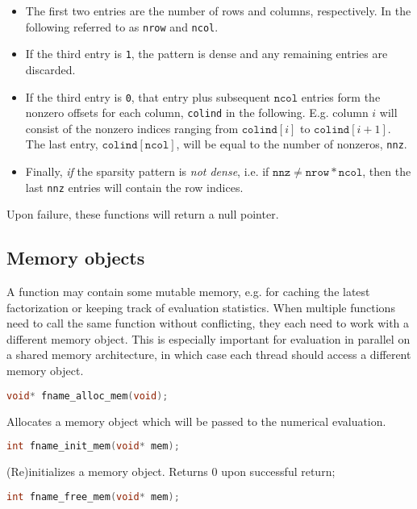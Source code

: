 \documentclass[a4paper,12pt]{book}
\begin{document}
\begin{itemize}
  \item The first two entries are the number of rows and columns, respectively.
  In the following referred to as \texttt{nrow} and \texttt{ncol}.
  \item If the third entry is \texttt{1}, the pattern is dense and any remaining entries are discarded.
  \item If the third entry is \texttt{0}, that entry plus subsequent $\texttt{ncol}$ entries form the nonzero offsets
  for each column, \texttt{colind} in the following. E.g. column $i$ will consist
  of the nonzero indices ranging from $\texttt{colind}[i]$ to $\texttt{colind}[i+1]$.
  The last entry, $\texttt{colind}[\texttt{ncol}]$, will be equal to the number
  of nonzeros, \texttt{nnz}.
  \item Finally, \emph{if} the sparsity pattern is \emph{not dense}, i.e. if
  $\texttt{nnz} \ne \texttt{nrow}*\texttt{ncol}$, then the last \texttt{nnz}
  entries will contain the row indices.
\end{itemize}

Upon failure, these functions will return a null pointer.

\subsection*{Memory objects}
A function may contain some mutable memory, e.g. for caching the latest
factorization or keeping track of evaluation statistics. When multiple functions
need to call the same function without conflicting, they each need to work with
a different memory object. This is especially important for evaluation in
parallel on a shared memory architecture, in which case each thread should access
a different memory object.

\begin{lstlisting}[language=C]
void* fname_alloc_mem(void);
\end{lstlisting}

Allocates a memory object which will be passed to the numerical evaluation.

\begin{lstlisting}[language=C]
int fname_init_mem(void* mem);
\end{lstlisting}

(Re)initializes a memory object. Returns 0 upon successful return;

\begin{lstlisting}[language=C]
int fname_free_mem(void* mem);
\end{lstlisting}
\end{document}

